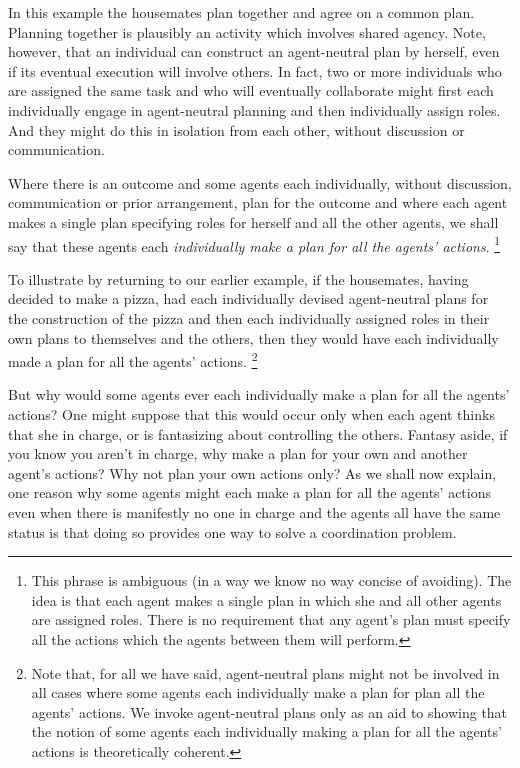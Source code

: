 \documentclass[12pt,\papersize]{extarticle}
\begin{document}
In this example
	the housemates plan together and agree on a common plan.
	Planning together is plausibly an activity which involves shared agency.
	Note, however, that an individual can construct an agent-neutral plan by herself, even if its eventual execution will involve others. 
	In fact, two or more individuals who are assigned the same task and who will eventually collaborate might first each individually engage in agent-neutral planning and then individually assign roles.
	And they might do this in isolation from each other, without discussion or communication.
	
Where there is an outcome and some agents each individually,
without discussion, communication or prior arrangement,
plan for the outcome 
and where each agent makes a single plan specifying roles for herself and all the other agents,
we shall say that these agents each 
\label{df:plan_all_actions}
\emph{individually make a plan for all the agents' actions}.%
\footnote{
This phrase is ambiguous (in a way we know  no way concise of avoiding).
The idea is that each agent makes a single plan in which she and  all other agents are assigned roles.
There is no requirement that any agent's plan must specify all the actions which the agents between them will perform.
}

To illustrate by returning to our earlier example, 
 if the housemates, having decided to make a pizza, had each individually devised  agent-neutral plans for the construction of the pizza and then each individually assigned roles in their own plans to themselves and the others, 
then they would have each individually made a plan for all the agents' actions.%
\footnote{
Note that, for all we have said,  agent-neutral plans might not be involved in all cases where some agents each individually make a plan for plan all the agents' actions.
We invoke agent-neutral plans only as an aid to showing that the notion of some 
agents each individually making a plan for all the agents' actions is theoretically coherent.
}
%



But why would some agents ever each individually make a plan for all the agents' actions?
One might suppose that this would occur only when each agent thinks that she in charge, or is fantasizing about controlling the others.
Fantasy aside, 
if you know you aren't in charge, why  make a plan for your own and another agent's actions?
Why not plan your own actions only?
As we shall now explain, 
one reason why some agents might each make a plan for all  the agents' actions 
	even when there is manifestly no one in charge and the agents all have the same status
	is that doing so provides one way to solve a coordination problem.
\end{document}
